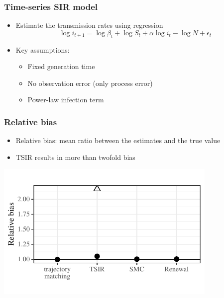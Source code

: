 \documentclass{beamer}
\begin{document}
\begin{frame}
\frametitle{Time-series SIR model}
\begin{itemize}
	\item Estimate the transmission rates using regression \citep{finkenstadt2000time}
	$$
	\log i_{t+1} = \log \beta_t + \log S_t + \alpha \log i_t - \log N + \epsilon_t
	$$
	\item Key assumptions:
	\begin{itemize}
		\item Fixed generation time
		\item No observation error (only process error)
		\item Power-law infection term
	\end{itemize}
\end{itemize}
\end{frame}

\begin{frame}
\frametitle{Relative bias}
\begin{itemize}
	\itemsep0.5em
	\item Relative bias: mean ratio between the estimates and the true value
	\item TSIR results in more than twofold bias
\end{itemize}
\begin{center}
\includegraphics[width=0.8\textwidth]{bias.pdf}
\end{center}
\end{frame}
\end{document}
